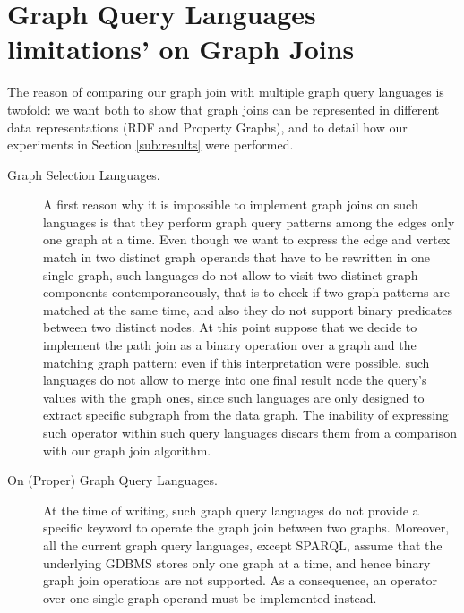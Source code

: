 \section{Graph Query Languages limitations' on Graph Joins}
The reason of comparing our graph join with multiple graph query languages is twofold: we want both to show that graph joins can be represented in different data representations (RDF and Property Graphs), and
to detail how our experiments in Section \ref{sub:results} were performed.

\begin{description}
	\item[Graph Selection Languages.]
	A first reason why it is impossible to implement graph joins on such languages is that they perform graph query patterns among the edges
	only one graph at a time. Even though we want to express the edge and vertex match in two distinct
	graph operands that have to be rewritten in one single graph, such languages
	do not allow to visit two distinct graph components contemporaneously, that is to check if two
	graph patterns are matched at the same time, and also they do not support binary predicates
	between two distinct nodes. At this point suppose that we decide to implement
	the path join as a binary operation over a graph and the matching graph pattern: even if this interpretation were possible,
	such languages do not allow to merge into one final result node the query's values with the
	graph ones, since such languages are only designed to extract specific subgraph from the data graph. 
	The inability of expressing such operator within such query languages discars them from a comparison with our graph join algorithm.

	\item[On (Proper) Graph Query Languages.] At the time of writing, such graph query languages do not provide
	a specific keyword to operate the graph join between two graphs. Moreover, all the current graph
	query languages, except SPARQL, assume that the underlying GDBMS stores only one graph at a time, and hence
	binary graph join operations are not supported. As a consequence, an operator over one single graph operand must be implemented instead.


\end{description}
